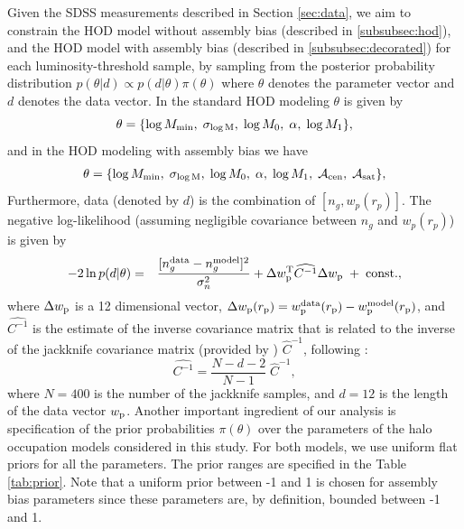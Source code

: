 \documentclass[12pt, preprint]{aastex}
\newcommand{\beq}{\begin{equation}}
\newcommand{\eeq}{\end{equation}}
\newcommand{\rpp}{r_{\rm p}}
\newcommand{\mzero}{\log M_{0}}
\newcommand{\mone}{\log M_{1}}
\newcommand{\mmin}{\log M_{\rm min}}
\newcommand{\sigmam}{\sigma_{\log \rm M}}
\newcommand{\wpp}{w_{\rm p}}
\newcommand{\acen}{\mathcal{A}_{\rm cen}}
\newcommand{\asat}{\mathcal{A}_{\rm sat}}
\begin{document}
Given the SDSS measurements described in Section \ref{sec:data}, we aim to constrain the HOD model without assembly bias (described in \ref{subsubsec:hod}), and the HOD model with assembly bias (described in \ref{subsubsec:decorated}) for each luminosity-threshold sample, by sampling from the posterior probability distribution $p(\theta|d) \propto p(d|\theta) \pi(\theta)$ where $\theta$ denotes the parameter vector and $d$ denotes the data vector. In the standard HOD modeling $\theta$ is given by
\beq
\theta = \{ \mmin,\;\sigmam,\;\mzero,\; \alpha,\;\mone \},
\eeq
and in the HOD modeling with assembly bias we have 
\begin{eqnarray}
\theta = \{\mmin,\; \sigmam, \;\mzero, \;\alpha, \;\mone,\;\acen,\; \asat \},
\end{eqnarray}
Furthermore, data (denoted by $d$) is the combination of $[n_{g}, w_{p}(r_{p})]$. The negative log-likelihood (assuming negligible covariance between $n_{g}$ and $w_{p}(r_{p})$) is given by
\begin{eqnarray}
-2\ln p(d|\theta) &=& \frac{[n^{\rm data}_{g}-n^{\rm model}_{g}]^{2}}{\sigma_{n}^{2}} + \Delta \wpp^{\rm T}\widehat{C^{-1}}\Delta \wpp \; + \; \rm{const.},
\label{eq:lnlike_wp}
\end{eqnarray}
where $\Delta \wpp$ is a 12 dimensional vector, $\Delta \wpp(\rpp) = \wpp^{\rm data}(\rpp)-\wpp^{\rm model}(\rpp)$, and  $\widehat{C^{-1}}$ is the estimate of the inverse covariance matrix that is related to the inverse of the jackknife covariance matrix (provided by \citealt{guo2015}) $\widehat{C}^{-1}$, following \citet{hartlap2007}:
\beq
\widehat{C^{-1}} = \frac{N -d - 2}{N -1} \; \widehat{C}^{-1},
\eeq
where $N=400$ is the number of the jackknife samples, and $d=12$ is the length of the data vector $w_{\rm p}$. Another important ingredient of our analysis is specification of the prior probabilities $\pi(\theta)$ over the parameters of the halo occupation models considered in this study. For both models, we use uniform flat priors for all the parameters. The prior ranges are specified in the Table \ref{tab:prior}. Note that a uniform prior between -1 and 1 is chosen for assembly bias parameters since these parameters are, by definition, bounded between -1 and 1. 
\end{document}
